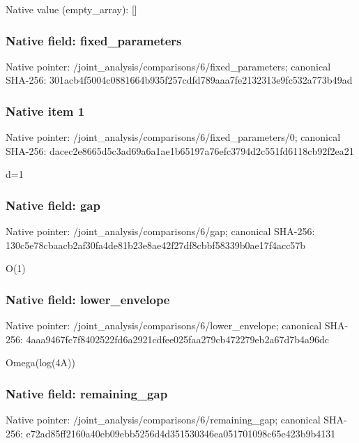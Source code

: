 \documentclass[10pt,a4paper]{article}
\begin{document}
Native value (empty\_\allowbreak{}array): []

\subsubsection{Native field: fixed\_\allowbreak{}parameters}
Native pointer: /joint\_\allowbreak{}analysis/comparisons/6/fixed\_\allowbreak{}parameters; canonical SHA-256: 301acb4f5004c0881664b935f257cdfd789aaa7fe2132313e9fc532a773b49ad

\subsubsection{Native item 1}
Native pointer: /joint\_\allowbreak{}analysis/comparisons/6/fixed\_\allowbreak{}parameters/0; canonical SHA-256: dacec2e8665d5c3ad69a6a1ae1b65197a76efc3794d2c551fd6118cb92f2ea21

\begingroup\raggedright\sloppy d=\allowbreak{}1\par\endgroup

\subsubsection{Native field: gap}
Native pointer: /joint\_\allowbreak{}analysis/comparisons/6/gap; canonical SHA-256: 130c5e78cbaacb2af30fa4de81b23e8ae42f27df8cbbf58339b0ae17f4acc57b

\begingroup\raggedright\sloppy O(1)\par\endgroup

\subsubsection{Native field: lower\_\allowbreak{}envelope}
Native pointer: /joint\_\allowbreak{}analysis/comparisons/6/lower\_\allowbreak{}envelope; canonical SHA-256: 4aaa9467fc7f8402522fd6a2921cdfee025faa279cb472279eb2a67d7b4a96dc

\begingroup\raggedright\sloppy Omega(log(4A))\par\endgroup

\subsubsection{Native field: remaining\_\allowbreak{}gap}
Native pointer: /joint\_\allowbreak{}analysis/comparisons/6/remaining\_\allowbreak{}gap; canonical SHA-256: c72ad85ff2160a40eb09ebb5256d4d351530346ea051701098c65e423b9b4131
\end{document}
